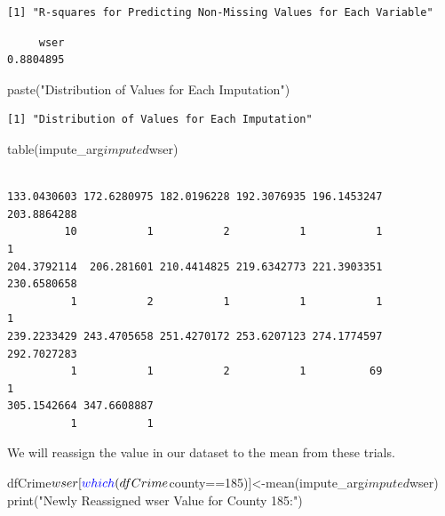\documentclass[]{article}
\newenvironment{Shaded}{}{}
\newcommand{\DecValTok}[1]{#1}
\newcommand{\KeywordTok}[1]{\textcolor[rgb]{0.00,0.00,1.00}{#1}}
\newcommand{\NormalTok}[1]{#1}
\newcommand{\OperatorTok}[1]{#1}
\newcommand{\StringTok}[1]{\textcolor[rgb]{0.00,0.50,0.50}{#1}}
\begin{document}
\begin{verbatim}
[1] "R-squares for Predicting Non-Missing Values for Each Variable"
\end{verbatim}

\begin{Shaded}
\end{Shaded}

\begin{verbatim}
     wser 
0.8804895 
\end{verbatim}

\begin{Shaded}
\begin{Highlighting}[]
\KeywordTok{paste}\NormalTok{(}\StringTok{"Distribution of Values for Each Imputation"}\NormalTok{)}
\end{Highlighting}
\end{Shaded}

\begin{verbatim}
[1] "Distribution of Values for Each Imputation"
\end{verbatim}

\begin{Shaded}
\begin{Highlighting}[]
\KeywordTok{table}\NormalTok{(impute_arg}\OperatorTok{$}\NormalTok{imputed}\OperatorTok{$}\NormalTok{wser)}
\end{Highlighting}
\end{Shaded}

\begin{verbatim}

133.0430603 172.6280975 182.0196228 192.3076935 196.1453247 203.8864288 
         10           1           2           1           1           1 
204.3792114  206.281601 210.4414825 219.6342773 221.3903351 230.6580658 
          1           2           1           1           1           1 
239.2233429 243.4705658 251.4270172 253.6207123 274.1774597 292.7027283 
          1           1           2           1          69           1 
305.1542664 347.6608887 
          1           1 
\end{verbatim}

We will reassign the value in our dataset to the mean from these trials.

\begin{Shaded}
\begin{Highlighting}[]
\NormalTok{dfCrime}\OperatorTok{$}\NormalTok{wser[}\KeywordTok{which}\NormalTok{(dfCrime}\OperatorTok{$}\NormalTok{county}\OperatorTok{==}\DecValTok{185}\NormalTok{)]<-}\KeywordTok{mean}\NormalTok{(impute_arg}\OperatorTok{$}\NormalTok{imputed}\OperatorTok{$}\NormalTok{wser)}
\KeywordTok{print}\NormalTok{(}\StringTok{"Newly Reassigned wser Value for County 185:"}\NormalTok{)}
\end{Highlighting}
\end{Shaded}
\end{document}
